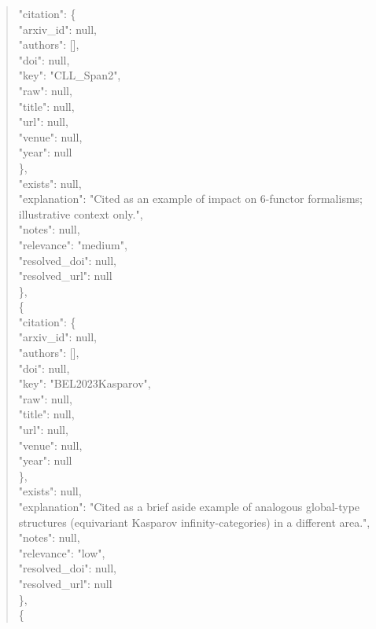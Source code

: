 \documentclass[11pt]{article}
\begin{document}
\begin{quote}
      "citation": \{\\
        "arxiv\_id": null,\\
        "authors": [],\\
        "doi": null,\\
        "key": "CLL\_Span2",\\
        "raw": null,\\
        "title": null,\\
        "url": null,\\
        "venue": null,\\
        "year": null\\
      \},\\
      "exists": null,\\
      "explanation": "Cited as an example of impact on 6-functor formalisms; illustrative context only.",\\
      "notes": null,\\
      "relevance": "medium",\\
      "resolved\_doi": null,\\
      "resolved\_url": null\\
    \},\\
    \{\\
      "citation": \{\\
        "arxiv\_id": null,\\
        "authors": [],\\
        "doi": null,\\
        "key": "BEL2023Kasparov",\\
        "raw": null,\\
        "title": null,\\
        "url": null,\\
        "venue": null,\\
        "year": null\\
      \},\\
      "exists": null,\\
      "explanation": "Cited as a brief aside example of analogous global-type structures (equivariant Kasparov infinity-categories) in a different area.",\\
      "notes": null,\\
      "relevance": "low",\\
      "resolved\_doi": null,\\
      "resolved\_url": null\\
    \},\\
    \{\\

\end{quote}
\end{document}
